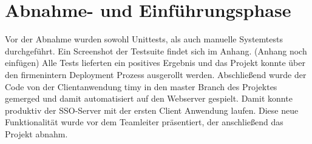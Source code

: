 \section{Abnahme- und Einführungsphase} 
\label{sec:AbnahmeEinfuehrung}

Vor der Abnahme wurden sowohl Unittests, als auch manuelle Systemtests durchgeführt. Ein Screenshot der Testsuite findet sich im Anhang. (Anhang noch einfügen)
Alle Tests  lieferten ein positives Ergebnis und das Projekt konnte über den firmenintern Deployment Prozess ausgerollt werden.
Abschließend wurde der Code von der Clientanwendung timy in den master Branch des Projektes gemerged und damit automatisiert auf den Webserver gespielt.
Damit konnte produktiv der SSO-Server mit der ersten Client Anwendung laufen. 
Diese neue Funktionalität wurde vor dem Teamleiter präsentiert, der anschließend das Projekt abnahm.
